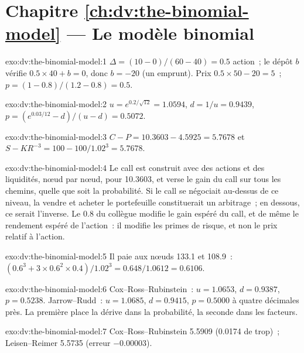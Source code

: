 \section*{Chapitre \ref{ch:dv:the-binomial-model} --- Le modèle binomial}

\begin{solution}{exo:dv:the-binomial-model:1}
$\Delta=(10-0)/(60-40)=0.5$ action~; le dépôt $b$ vérifie $0.5\times40+b=0$, donc
$b=-20$ (un emprunt). Prix $0.5\times50-20=5$~; $p=(1-0.8)/(1.2-0.8)=0.5$.
\end{solution}

\begin{solution}{exo:dv:the-binomial-model:2}
$u=e^{0.2/\sqrt{12}}=1.0594$, $d=1/u=0.9439$,
$p=(e^{0.03/12}-d)/(u-d)=0.5072$.
\end{solution}

\begin{solution}{exo:dv:the-binomial-model:3}
$C-P=10.3603-4.5925=5.7678$ et $S-KR^{-3}=100-100/1.02^3=5.7678$.
\end{solution}

\begin{solution}{exo:dv:the-binomial-model:4}
Le call est construit avec des actions et des liquidités, nœud par nœud, pour 10.3603, et verse le
gain du call sur tous les chemins, quelle que soit la probabilité. Si le call se négociait au-dessus de ce niveau,
la vendre et acheter le portefeuille constituerait un arbitrage~; en dessous, ce serait l'inverse.
Le 0.8 du collègue modifie le gain espéré du call, et de même le
rendement espéré de l'action~: il modifie les primes de risque, et non le prix relatif à l'action.
\end{solution}

\begin{solution}{exo:dv:the-binomial-model:5}
Il paie aux nœuds 133.1 et 108.9~: $(0.6^3+3\times0.6^2\times0.4)/1.02^3=0.648/1.0612=0.6106$.
\end{solution}

\begin{solution}{exo:dv:the-binomial-model:6}
Cox--Ross--Rubinstein~: $u=1.0653$, $d=0.9387$, $p=0.5238$. Jarrow--Rudd~:
$u=1.0685$, $d=0.9415$, $p=0.5000$ à quatre décimales près. La première place la dérive
dans la probabilité, la seconde dans les facteurs.
\end{solution}

\begin{solution}{exo:dv:the-binomial-model:7}
Cox--Ross--Rubinstein 5.5909 (0.0174 de trop)~; Leisen--Reimer 5.5735 (erreur
$-0.00003$).
\end{solution}

